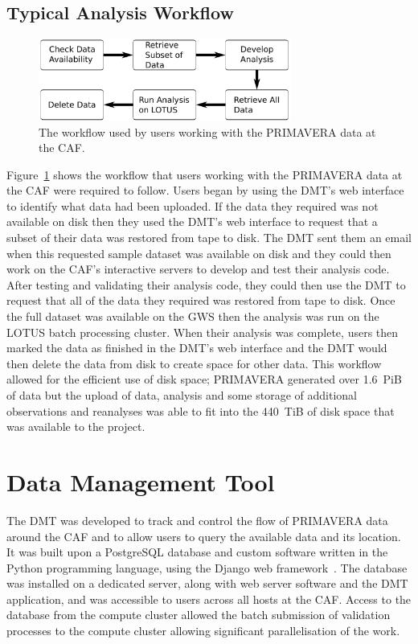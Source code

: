 \documentclass[gmd, manuscript]{copernicus}
\begin{document}
\subsection{Typical Analysis Workflow}
\label{typical_analysis_workflow}

\begin{figure}[ht]
	\includegraphics[width=8.3cm]{fig02.pdf}
	\caption{The workflow used by users working with the PRIMAVERA data at the CAF.}
	\label{analysis_workflow}
\end{figure}

Figure~\ref{analysis_workflow} shows the workflow that users working with the PRIMAVERA data at the CAF were required to follow. Users began by using the DMT's web interface to identify what data had been uploaded. If the data they required was not available on disk then they used the DMT's web interface to request that a subset of their data was restored from tape to disk. The DMT sent them an email when this requested sample dataset was available on disk and they could then work on the CAF's interactive servers to develop and test their analysis code. After testing and validating their analysis code, they could then use the DMT to request that all of the data they required was restored from tape to disk. Once the full dataset was available on the GWS then the analysis was run on the LOTUS batch processing cluster. When their analysis was complete, users then marked the data as finished in the DMT's web interface and the DMT would then delete the data from disk to create space for other data. This workflow allowed for the efficient use of disk space; PRIMAVERA generated over 1.6~PiB of data but the upload of data, analysis and some storage of additional observations and reanalyses was able to fit into the 440~TiB of disk space that was available to the project.

\section{Data Management Tool}

The DMT was developed to track and control the flow of PRIMAVERA data around the CAF and to allow users to query the available data and its location. It was built upon a PostgreSQL database and custom software written in the Python programming language, using the Django web framework~\citep{Django}. The database was installed on a dedicated server, along with web server software and the DMT application, and was accessible to users across all hosts at the CAF. Access to the database from the compute cluster allowed the batch submission of validation processes to the  compute cluster allowing significant parallelisation of the work.
\end{document}
